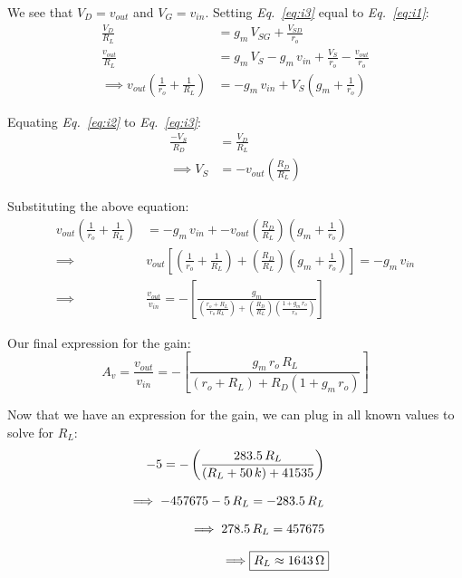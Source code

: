 \documentclass[12pt, fleqn]{article}
\begin{document}
\begin{enumerate}[label=(\alph*)]
    We see that $V_D = v_{out}$ and $V_G = v_{in}$.  Setting \textit{Eq.~\ref{eq:i3}} equal to \textit{Eq.~\ref{eq:i1}}:
    \begin{align*}
        \frac{V_D}{R_L} &= g_m\,V_{SG} + \frac{V_{SD}}{r_o}\\[0.25cm]
        \frac{v_{out}}{R_L} &= g_m\,V_S - g_m\,v_{in} + \frac{V_S}{r_o} - \frac{v_{out}}{r_o}\\[0.25cm]
        \implies v_{out}\left(\frac{1}{r_o} + \frac{1}{R_L}\right) &= -g_m\,v_{in} + V_S\left(g_m + \frac{1}{r_o}\right)
    \end{align*}

    Equating \textit{Eq.~\ref{eq:i2}} to \textit{Eq.~\ref{eq:i3}}:
    \begin{align*}
        \frac{-V_S}{R_D} &= \frac{V_D}{R_L}\\[0.25cm]
        \implies V_S &= -v_{out}\left(\frac{R_D}{R_L}\right)
    \end{align*}
    
    Substituting the above equation:
    \begin{align*}
        v_{out}\left(\frac{1}{r_o} + \frac{1}{R_L}\right) &= -g_m\,v_{in} + -v_{out}\left(\frac{R_D}{R_L}\right)\left(g_m + \frac{1}{r_o}\right)\\[0.25cm]
        \implies &v_{out}\left[\left(\frac{1}{r_o} + \frac{1}{R_L}\right) + \left(\frac{R_D}{R_L}\right)\left(g_m + \frac{1}{r_o}\right)\right] = -g_m\,v_{in}\\[0.25cm]
        \implies &\frac{v_{out}}{v_{in}} = -\left[\frac{g_m}{\left(\frac{r_o + R_L}{r_o\,R_L}\right)+ \left(\frac{R_D}{R_L}\right)\left(\frac{1 + g_m\,r_o}{r_o}\right)}\right]
    \end{align*}

    Our final expression for the gain:
    \begin{equation}
        \boxed{A_v = \frac{v_{out}}{v_{in}} = -\left[\frac{g_m\,r_o\,R_L}{\left(r_o + R_L\right)+ R_D \left(1 + g_m\,r_o\right)}\right]}
        \label{eq:circ_gain}
    \end{equation}
    
    Now that we have an expression for the gain, we can plug in all known values to solve for $R_L$:
    \begin{align*}
        -5 = - \left(\frac{283.5\,R_L}{(R_L + 50\,k) + 41535}\right)\\[0.25cm]
        \implies -457675 - 5\,R_L = -283.5\,R_L\\[0.25cm]
        \implies 278.5\,R_L = 457675\\[0.25cm]
        \implies \Aboxed{R_L \approx 1643\,\Omega}
    \end{align*}
    

\end{enumerate}
\end{document}
